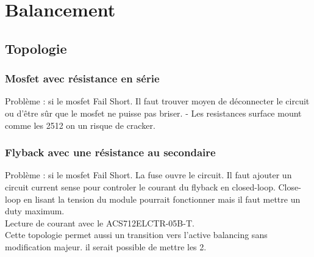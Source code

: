 

\section{Balancement}
	\subsection{Topologie}
		\subsubsection{Mosfet avec r\'{e}sistance en s\'{e}rie}
	Probl\`{e}me : si le mosfet Fail Short. Il faut trouver moyen de d\'{e}connecter le circuit ou d'\^{e}tre s\^{u}r que le mosfet ne puisse pas briser.
	- Les resistances surface mount comme les 2512 on un risque de cracker.
		\subsubsection{Flyback avec une r\'{e}sistance au secondaire}
	Probl\`{e}me : si le mosfet Fail Short. La fuse ouvre le circuit. Il faut ajouter un circuit current sense pour controler le courant du flyback en closed-loop. Close-loop en lisant la tension du module pourrait fonctionner mais il faut mettre un duty maximum. 
	\\Lecture de courant avec le ACS712ELCTR-05B-T.  \\
	Cette topologie permet aussi un transition vers l'active balancing sans modification majeur. il serait possible de mettre les 2.